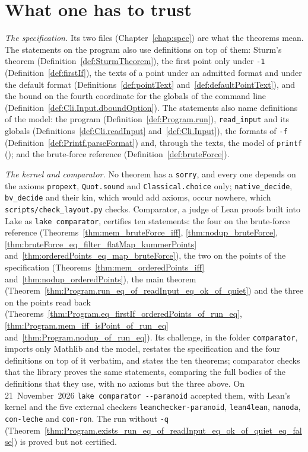 \section{What one has to trust}\label{sec:overviewTrust}

\emph{The specification.} Its two files (Chapter~\ref{chap:spec}) are what the theorems mean. The
statements on the program also use definitions on top of them: Sturm's theorem
(Definition~\ref{def:SturmTheorem}), the first point only under \verb|-1|
(Definition~\ref{def:firstIf}), the texts of a point under an admitted format and under the default
format (Definitions~\ref{def:pointText} and~\ref{def:defaultPointText}), and the bound on the fourth
coordinate for the globals of the command line (Definition~\ref{def:Cli.Input.dboundOption}). The
statements also name definitions of the model: the program (Definition~\ref{def:Program.run}),
\texttt{read\_input} and its globals (Definitions~\ref{def:Cli.readInput} and~\ref{def:Cli.Input}),
the formats of \verb|-f| (Definition~\ref{def:Printf.parseFormat}) and, through the texts, the model
of \texttt{printf} (); and the brute-force reference
(Definition~\ref{def:bruteForce}).

\emph{The kernel and comparator.} No theorem has a \verb|sorry|, and every one depends on the axioms
\verb|propext|, \verb|Quot.sound| and \verb|Classical.choice| only; \verb|native_decide|,
\verb|bv_decide| and their kin, which would add axioms, occur nowhere, which
\verb|scripts/check_layout.py| checks. Comparator, a judge of Lean proofs built into Lake as
\verb|lake comparator|, certifies ten statements: the four on the brute-force reference
(Theorems~\ref{thm:mem_bruteForce_iff}, \ref{thm:nodup_bruteForce},
\ref{thm:bruteForce_eq_filter_flatMap_kummerPoints} and~\ref{thm:orderedPoints_eq_map_bruteForce}),
the two on the points of the specification (Theorems~\ref{thm:mem_orderedPoints_iff}
and~\ref{thm:nodup_orderedPoints}), the main theorem
(Theorem~\ref{thm:Program.run_eq_of_readInput_eq_ok_of_quiet}) and the three on the points read back
(Theorems~\ref{thm:Program.eq_firstIf_orderedPoints_of_run_eq},
\ref{thm:Program.mem_iff_isPoint_of_run_eq} and~\ref{thm:Program.nodup_of_run_eq}). Its challenge,
in the folder \verb|comparator|, imports only Mathlib and the model, restates the specification and
the four definitions on top of it verbatim, and states the ten theorems; comparator checks that the
library proves the same statements, comparing the full bodies of the definitions that they use, with
no axioms but the three above. On 21~November~2026 \verb|lake comparator --paranoid| accepted them,
with Lean's kernel and the five external checkers \verb|leanchecker-paranoid|, \verb|lean4lean|,
\verb|nanoda|, \verb|con-leche| and \verb|con-ron|. The run without \verb|-q|
(Theorem~\ref{thm:Program.exists_run_eq_of_readInput_eq_ok_of_quiet_eq_false}) is proved but not
certified.

